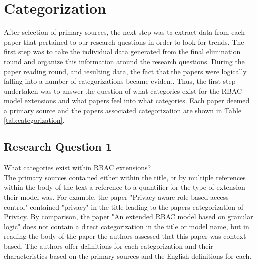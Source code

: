 \section{Categorization} \label{sec:categorization}

After selection of primary sources, the next step was to extract data from each paper that pertained to our research questions in order to look for trends.  The first step was to take the individual data generated from the final elimination round and organize this information around the research questions.  During the paper reading round, and resulting data, the fact that the papers were logically falling into a number of categorizations became evident.  Thus, the first step undertaken was to answer the question of what categories exist for the RBAC model extensions and what papers feel into what categories.  Each paper deemed a primary source and the papers associated categorization are shown in Table \ref{tab:categorization}.

\subsection{Research Question 1}

What categories exist within RBAC extensions? \\

The primary sources contained either within the title, or by multiple references within the body of the text a reference to a quantifier for the
type of extension their model was.  For example, the paper "Privacy-aware role-based access control" \cite{ni2010privacy} contained "privacy" in
the title leading to the papers categorization of Privacy.  By comparison, the paper "An extended RBAC model based on granular logic" \cite{jian2008extended}
does not contain a direct categorization in the title or model name, but in reading the body of the paper the authors assessed that this paper was 
context based.  The authors offer definitions for each categorization and their characteristics based on the primary sources and the English definitions
for each.

